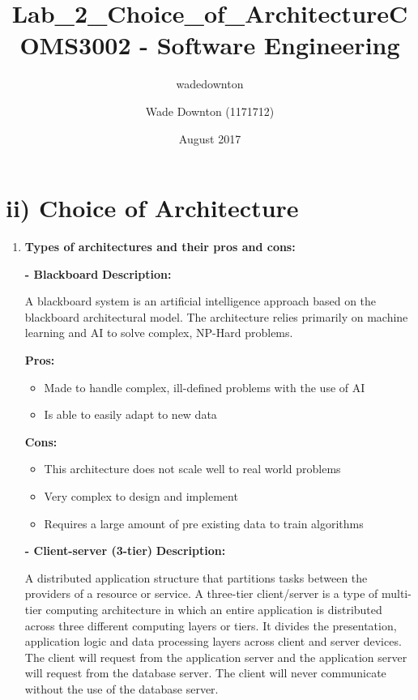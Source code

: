 \documentclass{article}
\title{Lab_2_Choice_of_Architecture}
\author{wadedownton}
\date{August 2017}
\begin{document}
	
	\title{COMS3002 - Software Engineering}
	\author{Wade Downton (1171712)}
	\maketitle
	
	\section{ii) Choice of Architecture}
	\begin{enumerate}
		\item \textbf{Types of architectures and their pros and cons:}
		\newline
		
		
		
		\textbf{- Blackboard}
		\newline\newline
		\textbf{Description:}
		
		\begin{flushleft}
			A blackboard system is an artificial intelligence approach based on the blackboard architectural model.
			The architecture relies primarily on machine learning and AI to	solve complex, NP-Hard problems.				
		\end{flushleft}
		
		\textbf{Pros:}
		\begin{itemize}
			\item Made to handle complex, ill-defined problems with the use of AI
			\item Is able to easily adapt to new data
		\end{itemize}
		
		\textbf{Cons:}
		\begin{itemize}
			\item This architecture does not scale well to real world problems
			\item Very complex to design and implement
			\item Requires a large amount of pre existing data to train algorithms
		\end{itemize}
		
		
		
		\newline
		\textbf{- Client-server (3-tier)}
		\newline\newline
		\textbf{Description:}
		
		\begin{flushleft}
			A distributed application structure that partitions tasks between the providers of a resource or service. 
			A three-tier client/server is a type of multi-tier computing architecture in which an entire application 
			is distributed across three different computing layers or tiers. It divides the presentation, application 
			logic and data processing layers across client and server devices. The client will request from the application 
			server and the application server will request from the database server. The client will never communicate 
			without the use of the database server.				
		\end{flushleft}
		

\end{enumerate}
\end{document}
